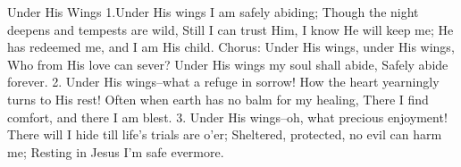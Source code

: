 Under His Wings
1.Under His wings I am safely abiding;
    Though the night deepens and tempests are wild,
Still I can trust Him, I know He will keep me;
    He has redeemed me, and I am His child. 
Chorus: Under His wings, under His wings,
    Who from His love can sever?
Under His wings my soul shall abide,
    Safely abide forever. 
2. Under His wings--what a refuge in sorrow!
    How the heart yearningly turns to His rest!
Often when earth has no balm for my healing,
    There I find comfort, and there I am blest. 
3. Under His wings--oh, what precious enjoyment!
    There will I hide till life's trials are o'er;
Sheltered, protected, no evil can harm me;
    Resting in Jesus I'm safe evermore.





